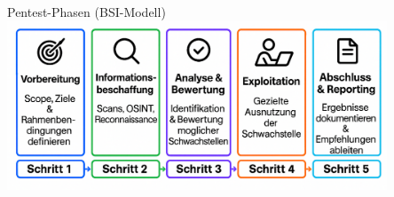 \documentclass[
	aspectratio=169,	%
	onlytextwidth,		%
	t,					%
	]{beamer}
\begin{document}

\begin{frame}{Pentest-Phasen (BSI-Modell)}
	\centering
	\includegraphics[width=0.85\textwidth]{figures/Phase.png}
	\label{fig:phase}
\end{frame}
\end{document}
